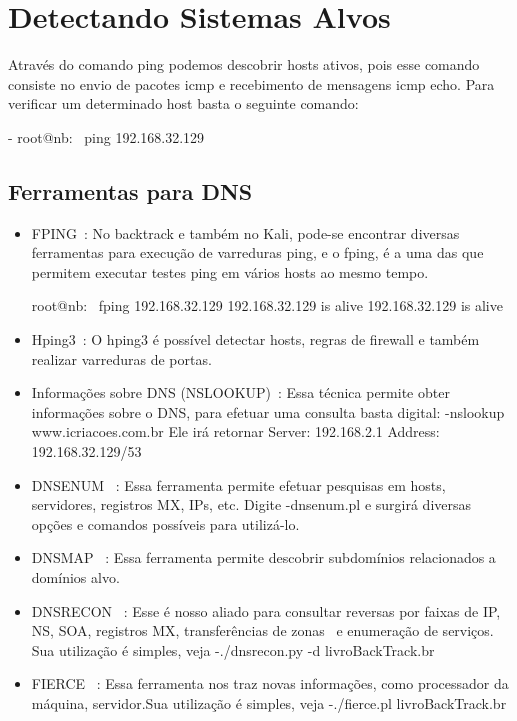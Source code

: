 \section{Detectando Sistemas Alvos}
Através do comando ping podemos descobrir hosts ativos, pois esse comando consiste no envio de pacotes icmp e recebimento de mensagens icmp echo. Para verificar um determinado host basta o seguinte comando:

- root@nb:~ ping 192.168.32.129

\subsection {Ferramentas para DNS}  

\begin{itemize}
\item FPING~\cite{giavaroto}: No backtrack e também no Kali, pode-se encontrar diversas ferramentas para execução de varreduras ping, e o fping, é a uma das que permitem executar testes ping em vários hosts ao mesmo tempo.


root@nb:~ fping 192.168.32.129
192.168.32.129 is alive
192.168.32.129 is alive


\item Hping3~\cite{giavaroto}:
O hping3 é possível detectar hosts, regras de firewall e também realizar varreduras de portas.

\item Informações sobre DNS (NSLOOKUP)~\cite{giavaroto}: Essa técnica permite obter informações sobre o DNS, para efetuar uma consulta basta digital: -nslookup www.icriacoes.com.br Ele irá retornar Server: 192.168.2.1 Address: 192.168.32.129/53

\item DNSENUM~\cite{giavaroto} : Essa ferramenta permite efetuar pesquisas em hosts, servidores, registros MX, IPs, etc. Digite -dnsenum.pl e surgirá diversas opções e comandos possíveis para utilizá-lo.

\item DNSMAP~\cite{giavaroto} : Essa ferramenta permite descobrir subdomínios relacionados a domínios alvo.

\item DNSRECON~\cite{giavaroto} : Esse é nosso aliado para consultar reversas por faixas de IP, NS, SOA, registros MX, transferências de zonas~\cite{giavaroto} e enumeração de serviços. Sua utilização é simples, veja -./dnsrecon.py -d livroBackTrack.br

\item FIERCE~\cite{giavaroto} : Essa ferramenta nos traz novas informações, como processador da máquina, servidor.Sua utilização é simples, veja -./fierce.pl livroBackTrack.br

\end{itemize}


